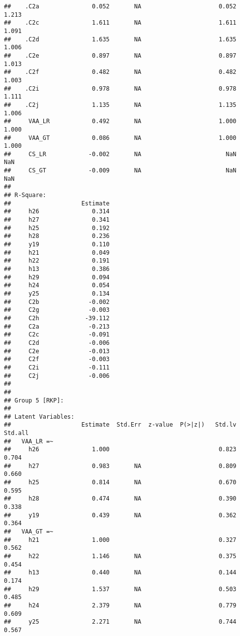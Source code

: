 \documentclass[
]{article}
\begin{document}
\begin{verbatim}
##    .C2a               0.052       NA                      0.052    1.213
##    .C2c               1.611       NA                      1.611    1.091
##    .C2d               1.635       NA                      1.635    1.006
##    .C2e               0.897       NA                      0.897    1.013
##    .C2f               0.482       NA                      0.482    1.003
##    .C2i               0.978       NA                      0.978    1.111
##    .C2j               1.135       NA                      1.135    1.006
##     VAA_LR            0.492       NA                      1.000    1.000
##     VAA_GT            0.086       NA                      1.000    1.000
##     CS_LR            -0.002       NA                        NaN      NaN
##     CS_GT            -0.009       NA                        NaN      NaN
## 
## R-Square:
##                    Estimate
##     h26               0.314
##     h27               0.341
##     h25               0.192
##     h28               0.236
##     y19               0.110
##     h21               0.049
##     h22               0.191
##     h13               0.386
##     h29               0.094
##     h24               0.054
##     y25               0.134
##     C2b              -0.002
##     C2g              -0.003
##     C2h             -39.112
##     C2a              -0.213
##     C2c              -0.091
##     C2d              -0.006
##     C2e              -0.013
##     C2f              -0.003
##     C2i              -0.111
##     C2j              -0.006
## 
## 
## Group 5 [RKP]:
## 
## Latent Variables:
##                    Estimate  Std.Err  z-value  P(>|z|)   Std.lv  Std.all
##   VAA_LR =~                                                             
##     h26               1.000                               0.823    0.704
##     h27               0.983       NA                      0.809    0.660
##     h25               0.814       NA                      0.670    0.595
##     h28               0.474       NA                      0.390    0.338
##     y19               0.439       NA                      0.362    0.364
##   VAA_GT =~                                                             
##     h21               1.000                               0.327    0.562
##     h22               1.146       NA                      0.375    0.454
##     h13               0.440       NA                      0.144    0.174
##     h29               1.537       NA                      0.503    0.485
##     h24               2.379       NA                      0.779    0.609
##     y25               2.271       NA                      0.744    0.567

\end{verbatim}
\end{document}
